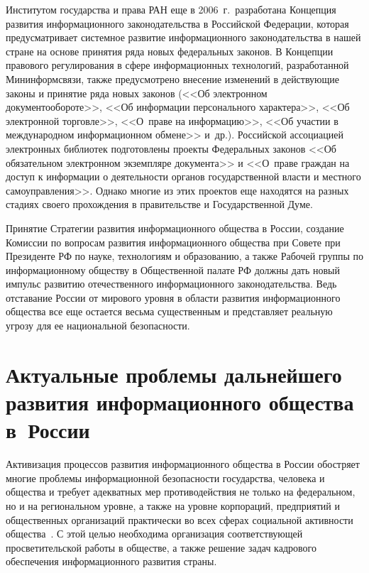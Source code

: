 \begin{multicols}{2}
     Институтом государства и права РАН еще в 2006~г.\ разработана Концепция
развития информационного законодательства в Российской Федерации, которая
предусматривает системное развитие информационного законодательства в нашей стране
на основе принятия ряда новых федеральных законов. В Концепции правового
регулирования в сфере информационных технологий, разработанной Мининформсвязи,
также предусмотрено внесение изменений в действующие законы и принятие ряда
новых законов (<<Об электронном
 документообороте>>, <<Об информации
персонального характера>>, <<Об электронной торговле>>, <<О~праве на
информацию>>, <<Об участии в международном информационном обмене>> и~др.).
Российской ассоциацией электронных библиотек подготовлены проекты Федеральных
законов <<Об обязательном электронном экземпляре документа>> и <<О~праве граждан
на доступ к информации о деятельности органов государственной власти и местного
самоуправления>>. Однако многие из этих проектов еще находятся на разных стадиях
своего прохождения в правительстве и Государственной Думе.
{

}

     Принятие Стратегии развития информационного общества в России, создание
Комиссии по вопросам развития информационного общества при Совете при Президенте
РФ по науке, технологиям и образованию, а также Рабочей группы по информационному
обществу в Общественной палате РФ должны дать новый импульс развитию
отечественного информационного законодательства. Ведь отста\-ва\-ние России от мирового
уровня в об\-ласти %
развития информационного общества все еще остается весьма
существенным и представляет реальную угрозу для ее национальной безопасности.

\section{Актуальные проблемы дальнейшего развития
информационного общества в~России}

     Активизация процессов развития информационного общества в России обостряет
многие проблемы информационной безопасности государства, человека и общества и
требует адекватных мер противодействия не только на федеральном, но и на
региональном уровне, а также на уровне корпораций, предприятий и общественных
организаций практически во всех сферах социальной активности общества~\cite{3ss}. С этой целью
необходима организация соответствующей просветительской работы в обществе, а также
решение задач кадрового обеспечения информационного развития страны.


\end{multicols}
